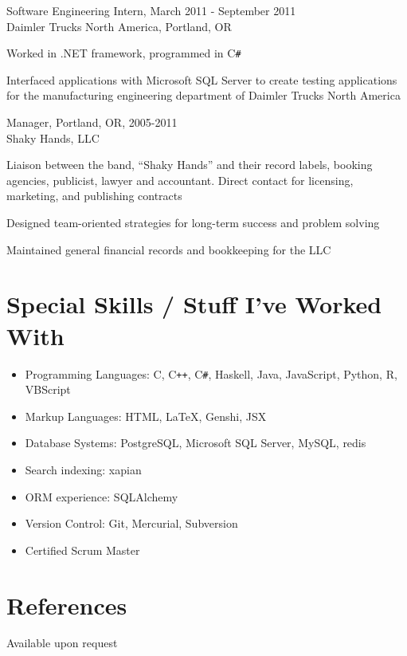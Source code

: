 \documentclass{res} %
\newenvironment{packed_item}{
\begin{itemize}
  \setlength{\itemsep}{1pt}
  \setlength{\parskip}{0pt}
  \setlength{\parsep}{0pt}
}{\end{itemize}}
\begin{document}
\begin{resume}
Software Engineering Intern, March 2011 - September 2011 \\
Daimler Trucks North America, Portland, OR

\begin{packed_item}
	\item{Worked in .NET framework, programmed in C\verb!#!}
	\item{Interfaced applications with Microsoft SQL Server to create testing
			applications for the manufacturing engineering department of Daimler
			Trucks North America}
\end{packed_item}


\pagebreak

Manager, Portland, OR, 2005-2011\\
Shaky Hands, LLC
\begin{packed_item}
    \item{Liaison between the band, ``Shaky Hands'' and their record labels, booking
          agencies, publicist, lawyer and accountant. Direct contact for licensing, marketing, and publishing contracts}
    \item{Designed team-oriented strategies for long-term success and problem
          solving}
    \item{Maintained general financial records and bookkeeping for the LLC}
\end{packed_item}

\section{Special Skills / Stuff I've Worked With}
\begin{itemize}
\item Programming Languages: C, C\verb!++!, C\verb!#!, Haskell, Java, JavaScript,
      Python, R, VBScript
\item Markup Languages: HTML, \LaTeX, Genshi, JSX
\item Database Systems: PostgreSQL, Microsoft SQL Server, MySQL, redis
\item Search indexing: xapian
\item ORM experience: SQLAlchemy
\item Version Control: Git, Mercurial, Subversion
\item Certified Scrum Master
\end{itemize}

\section{References}
Available upon request

\end{resume}
\end{document}
